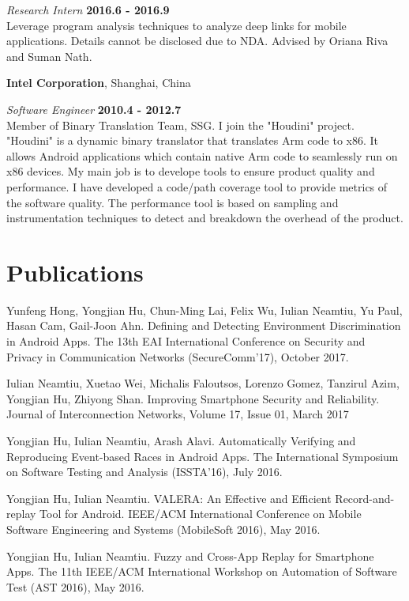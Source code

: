 \documentclass[margin,line]{res}
\begin{document}
\begin{resume}
\vspace{-.3cm}
{\em Research Intern} \hfill {\bf 2016.6 - 2016.9}\\
Leverage program analysis techniques to analyze deep links for mobile applications.
Details cannot be disclosed due to NDA.
Advised by Oriana Riva and Suman Nath.

\vspace{1.0cm}

{\bf Intel Corporation}, Shanghai, China

\vspace{-.3cm}
{\em Software Engineer} \hfill {\bf 2010.4 - 2012.7}\\
Member of Binary Translation Team, SSG. I join the "Houdini" project.
"Houdini" is a dynamic binary translator that translates Arm code to 
x86. It allows Android applications which contain native Arm code to 
seamlessly run on x86 devices. My main job is to develope tools to ensure 
product quality and performance. I have developed a code/path coverage 
tool to provide metrics of the software quality. The performance tool 
is based on sampling and instrumentation techniques to detect and 
breakdown the overhead of the product.


\section{\sc Publications}
Yunfeng Hong, Yongjian Hu, Chun-Ming Lai, Felix Wu, Iulian Neamtiu, Yu Paul, Hasan Cam, Gail-Joon Ahn.
Defining and Detecting Environment Discrimination in Android Apps.
The 13th EAI International Conference on Security and Privacy in Communication Networks (SecureComm'17), October 2017.

Iulian Neamtiu, Xuetao Wei, Michalis Faloutsos, Lorenzo Gomez, Tanzirul Azim, Yongjian Hu, Zhiyong Shan.
Improving Smartphone Security and Reliability.
Journal of Interconnection Networks, Volume 17, Issue 01, March 2017

Yongjian Hu, Iulian Neamtiu, Arash Alavi. Automatically Verifying and Reproducing Event-based Races in Android Apps.
The International Symposium on Software Testing and Analysis (ISSTA'16), July 2016.

Yongjian Hu, Iulian Neamtiu. VALERA: An Effective and Efficient Record-and-replay Tool for Android.
IEEE/ACM International Conference on Mobile Software Engineering and Systems (MobileSoft 2016), May 2016.

Yongjian Hu, Iulian Neamtiu. Fuzzy and Cross-App Replay for Smartphone Apps.
The 11th IEEE/ACM International Workshop on Automation of Software Test (AST 2016), May 2016.


\end{resume}
\end{document}
